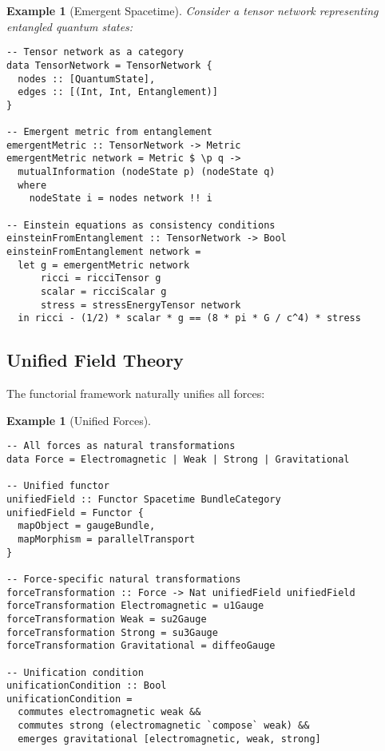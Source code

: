 \documentclass[11pt,a4paper]{article}
\newtheorem{example}[theorem]{Example}
\begin{document}
\begin{example}[Emergent Spacetime]
Consider a tensor network representing entangled quantum states:
\begin{lstlisting}
-- Tensor network as a category
data TensorNetwork = TensorNetwork {
  nodes :: [QuantumState],
  edges :: [(Int, Int, Entanglement)]
}

-- Emergent metric from entanglement
emergentMetric :: TensorNetwork -> Metric
emergentMetric network = Metric $ \p q ->
  mutualInformation (nodeState p) (nodeState q)
  where
    nodeState i = nodes network !! i

-- Einstein equations as consistency conditions
einsteinFromEntanglement :: TensorNetwork -> Bool
einsteinFromEntanglement network =
  let g = emergentMetric network
      ricci = ricciTensor g
      scalar = ricciScalar g
      stress = stressEnergyTensor network
  in ricci - (1/2) * scalar * g == (8 * pi * G / c^4) * stress
\end{lstlisting}
\end{example}

\subsection{Unified Field Theory}

The functorial framework naturally unifies all forces:

\begin{example}[Unified Forces]
\begin{lstlisting}
-- All forces as natural transformations
data Force = Electromagnetic | Weak | Strong | Gravitational

-- Unified functor
unifiedField :: Functor Spacetime BundleCategory
unifiedField = Functor {
  mapObject = gaugeBundle,
  mapMorphism = parallelTransport
}

-- Force-specific natural transformations
forceTransformation :: Force -> Nat unifiedField unifiedField
forceTransformation Electromagnetic = u1Gauge
forceTransformation Weak = su2Gauge  
forceTransformation Strong = su3Gauge
forceTransformation Gravitational = diffeoGauge

-- Unification condition
unificationCondition :: Bool
unificationCondition = 
  commutes electromagnetic weak &&
  commutes strong (electromagnetic `compose` weak) &&
  emerges gravitational [electromagnetic, weak, strong]
\end{lstlisting}
\end{example}
\end{document}

